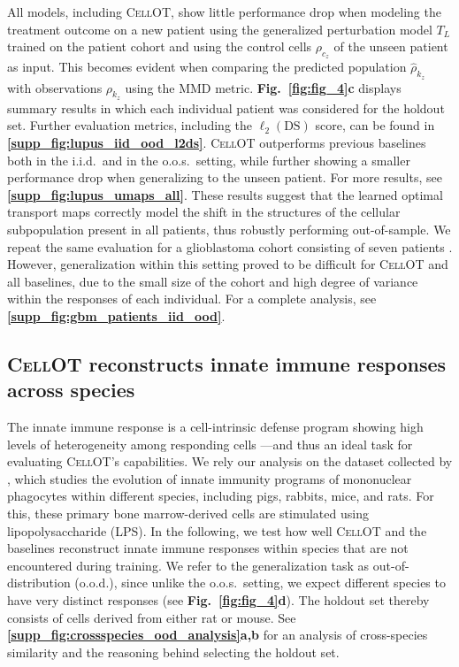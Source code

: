 All models, including \textsc{CellOT}, show little performance drop when modeling the treatment outcome on a new patient using the generalized perturbation model $T_L$ trained on the patient cohort and using the control cells $\rho_{c_z}$ of the unseen patient as input.
This becomes evident when comparing the predicted population $\hat{\rho}_{k_z}$ with observations $\rho_{k_z}$ using the MMD metric. \textbf{Fig.~\ref{fig:fig_4}c} displays summary results in which each individual patient was considered for the holdout set. Further evaluation metrics, including the $\ell_2(\text{DS})$ score, can be found in \textbf{\ref{supp_fig:lupus_iid_ood_l2ds}}. \textsc{CellOT} outperforms previous baselines both in the i.i.d.~and in the o.o.s.~setting, while further showing a smaller performance drop when generalizing to the unseen patient. For more results, see \textbf{\ref{supp_fig:lupus_umaps_all}}.
These results suggest that the learned optimal transport maps correctly model the shift in the structures of the cellular subpopulation present in all patients, thus robustly performing out-of-sample.
We repeat the same evaluation for a glioblastoma cohort consisting of seven patients \cite{zhao2021deconvolution}. However, generalization within this setting proved to be difficult for \textsc{CellOT} and all baselines, due to the small size of the cohort and high degree of variance within the responses of each individual. 
For a complete analysis, see \textbf{\ref{supp_fig:gbm_patients_iid_ood}}.

\subsection{\textsc{CellOT} reconstructs innate immune responses across species}

The innate immune response is a cell-intrinsic defense program showing high levels of heterogeneity among responding cells ---and thus an ideal task for evaluating \textsc{CellOT}'s capabilities. We rely our analysis on the dataset collected by \citet{hagai2018gene}, which studies the evolution of innate immunity programs of mononuclear phagocytes within different species, including pigs, rabbits, mice, and rats. For this, these primary bone marrow-derived cells are stimulated using lipopolysaccharide (LPS).
In the following, we test how well \textsc{CellOT} and the baselines reconstruct innate immune responses within species that are not encountered during training. We refer to the generalization task as out-of-distribution (o.o.d.), since unlike the o.o.s.~setting, we expect different species to have very distinct responses (see \textbf{Fig.~\ref{fig:fig_4}d}).
The holdout set thereby consists of cells derived from either rat or mouse. See \textbf{\ref{supp_fig:crossspecies_ood_analysis}a,b} for an analysis of cross-species similarity and the reasoning behind selecting the holdout set.

